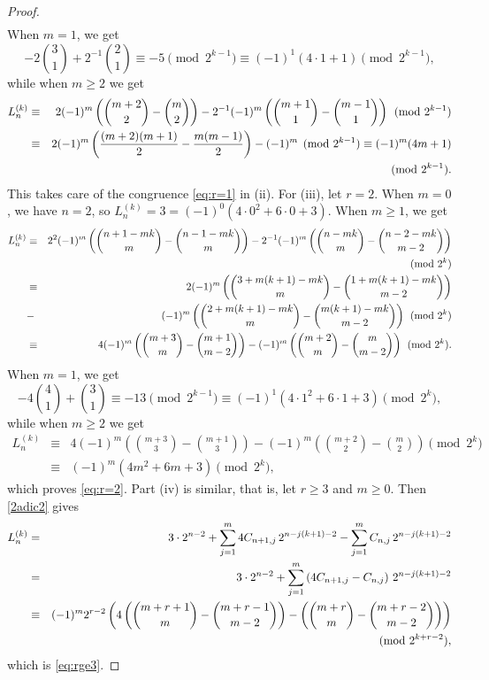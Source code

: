 \documentclass[11pt,a4paper]{article}
\numberwithin{equation}{section}
\numberwithin{table}{section}
\numberwithin{figure}{section}
\begin{document}
\begin{proof}
\begin{eqnarray*}
\end{eqnarray*}
When $m=1$, we get 
$$
-2\binom{3}{1}+2^{-1}\binom{2}{1}\equiv -5\pmod {2^{k-1}}\equiv (-1)^1(4\cdot 1+1)\pmod {2^{k-1}},
$$
while when $m\ge 2$ we get
\begin{eqnarray*}
L_n^{(k)} & \equiv &  2(-1)^m \left(\binom{m+2}{2}-\binom{m}{2}\right)-2^{-1}(-1)^m\left(\binom{m+1}{1}-\binom{m-1}{1}\right)\pmod {2^{k-1}}\\
& \equiv &   2(-1)^m \left(\frac{(m+2)(m+1)}{2}-\frac{m(m-1)}{2}\right)-(-1)^m\pmod {2^{k-1}}\equiv (-1)^m(4m+1)\\
&~&\hfill\pmod {2^{k-1}}.
\end{eqnarray*}
This takes care of the congruence \eqref{eq:r=1} in (ii). For (iii), let $r=2$. When $m=0$, we have $n=2$, so $L_n^{(k)}=3=(-1)^0(4\cdot 0^2+6\cdot 0+3)$. When $m\ge 1$, we get
\begin{eqnarray*}
L_n^{(k)} & \equiv & 2^2(-1)^m \left(\binom{n+1-mk}{m}-\binom{n-1-mk}{m}\right)-2^{-1}(-1)^m \left(\binom{n-mk}{m}-\binom{n-2-mk}{m-2}\right)\\
&~&\hfill\pmod {2^{k}}\\
& \equiv &  
2(-1)^m \left(\binom{3+m(k+1)-mk}{m}-\binom{1+m(k+1)-mk}{m-2}\right)\\ 
& -& (-1)^m \left(\binom{2+m(k+1)-mk}{m}-\binom{m(k+1)-mk}{m-2}\right)\pmod {2^{k}}\\
& \equiv &  
4(-1)^m \left(\binom{m+3}{m}-\binom{m+1}{m-2}\right)-(-1)^m\left(\binom{m+2}{m}-\binom{m}{m-2}\right)\pmod {2^{k}}.\\
\end{eqnarray*}
When $m=1$, we get 
$$
-4\binom{4}{1}+\binom{3}{1}\equiv -13\pmod {2^{k-1}}\equiv (-1)^1(4\cdot 1^2+6\cdot 1+3)\pmod {2^{k}},
$$
while when $m\ge 2$ we get
\begin{eqnarray*}
L_n^{(k)} & \equiv &  4(-1)^m \left(\binom{m+3}{3}-\binom{m+1}{3}\right)-(-1)^m\left(\binom{m+2}{2}-\binom{m}{2}\right)\pmod {2^{k}}\\
& \equiv &  
(-1)^m(4m^2+6m+3)\pmod {2^{k}},
\end{eqnarray*}
which proves \eqref{eq:r=2}.
Part (iv) is similar, that is, let $r\ge 3$ and $m\ge 0$. Then \eqref{2adic2} gives
\begin{eqnarray*}
	L_n^{(k)} & = & 3\cdot2^{n-2}+
	\sum_{j = 1}^{m}4 C_{n+1, j} \, 2^{n - j(k+1) -2}
	- \sum_{j = 1}^{m} C_{n, j} \, 2^{n - j(k+1) - 2}\\
	& = & 3\cdot2^{n-2}+
	\sum_{j = 1}^{m}\left(4 C_{n+1, j}-C_{n, j}\right) \, 2^{n - j(k+1) -2}\\
	&\equiv & (-1)^m 2^{r-2} \left(4\left(\binom{m+r+1}{m}-\binom{m+r-1}{m-2}\right)-\left(\binom{m+r}{m}-\binom{m+r-2}{m-2}\right)\right)\\
	&~&\hfill\pmod {2^{k+r-2}},
\end{eqnarray*}
which is \eqref{eq:rge3}.
\end{proof}
\end{document}
